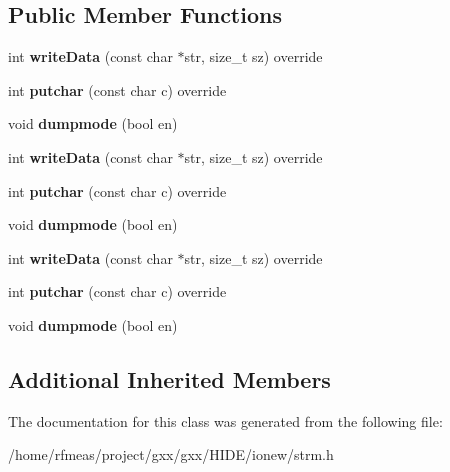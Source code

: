 \subsection*{Public Member Functions}
\begin{DoxyCompactItemize}
\item 
int {\bfseries write\+Data} (const char $\ast$str, size\+\_\+t sz) override\hypertarget{classgxx_1_1io_1_1debug__strmout_adb8926ce207b7d278a82f63cfe3c7a83}{}\label{classgxx_1_1io_1_1debug__strmout_adb8926ce207b7d278a82f63cfe3c7a83}

\item 
int {\bfseries putchar} (const char c) override\hypertarget{classgxx_1_1io_1_1debug__strmout_a5a86485ab4721b21b9e7e7cc25784dfc}{}\label{classgxx_1_1io_1_1debug__strmout_a5a86485ab4721b21b9e7e7cc25784dfc}

\item 
void {\bfseries dumpmode} (bool en)\hypertarget{classgxx_1_1io_1_1debug__strmout_a61b908e1b1b31c3356d9a152bb1b7eda}{}\label{classgxx_1_1io_1_1debug__strmout_a61b908e1b1b31c3356d9a152bb1b7eda}

\item 
int {\bfseries write\+Data} (const char $\ast$str, size\+\_\+t sz) override\hypertarget{classgxx_1_1io_1_1debug__strmout_adb8926ce207b7d278a82f63cfe3c7a83}{}\label{classgxx_1_1io_1_1debug__strmout_adb8926ce207b7d278a82f63cfe3c7a83}

\item 
int {\bfseries putchar} (const char c) override\hypertarget{classgxx_1_1io_1_1debug__strmout_a5a86485ab4721b21b9e7e7cc25784dfc}{}\label{classgxx_1_1io_1_1debug__strmout_a5a86485ab4721b21b9e7e7cc25784dfc}

\item 
void {\bfseries dumpmode} (bool en)\hypertarget{classgxx_1_1io_1_1debug__strmout_a61b908e1b1b31c3356d9a152bb1b7eda}{}\label{classgxx_1_1io_1_1debug__strmout_a61b908e1b1b31c3356d9a152bb1b7eda}

\item 
int {\bfseries write\+Data} (const char $\ast$str, size\+\_\+t sz) override\hypertarget{classgxx_1_1io_1_1debug__strmout_adb8926ce207b7d278a82f63cfe3c7a83}{}\label{classgxx_1_1io_1_1debug__strmout_adb8926ce207b7d278a82f63cfe3c7a83}

\item 
int {\bfseries putchar} (const char c) override\hypertarget{classgxx_1_1io_1_1debug__strmout_a5a86485ab4721b21b9e7e7cc25784dfc}{}\label{classgxx_1_1io_1_1debug__strmout_a5a86485ab4721b21b9e7e7cc25784dfc}

\item 
void {\bfseries dumpmode} (bool en)\hypertarget{classgxx_1_1io_1_1debug__strmout_a61b908e1b1b31c3356d9a152bb1b7eda}{}\label{classgxx_1_1io_1_1debug__strmout_a61b908e1b1b31c3356d9a152bb1b7eda}

\end{DoxyCompactItemize}
\subsection*{Additional Inherited Members}


The documentation for this class was generated from the following file\+:\begin{DoxyCompactItemize}
\item 
/home/rfmeas/project/gxx/gxx/\+H\+I\+D\+E/ionew/strm.\+h\end{DoxyCompactItemize}

